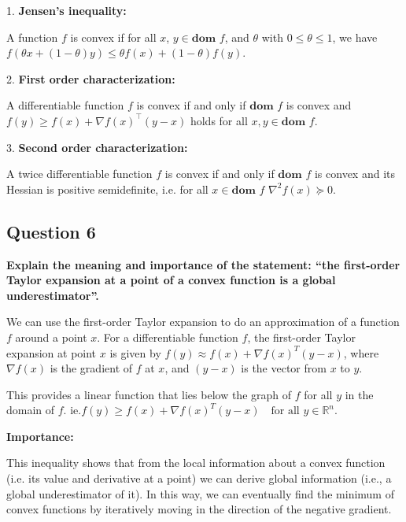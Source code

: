 1. \textbf{Jensen's inequality:} 

A function $f$ is convex if for all $x$, $y \in \textbf{dom } f$, and $\theta$ with $0 \le \theta \le  1$, we have $ f(\theta x + (1 - \theta)y) \le  \theta f(x) + (1 - \theta)f(y)$. 

2. \textbf{First order characterization:} 

A differentiable function $f$ is convex if and only if $\textbf{dom } f$ is convex and $f(y) \ge f(x) + \nabla f(x)^\top (y-x)$ holds for all $x,y \in \textbf{dom }f$. 

3. \textbf{Second order characterization:} 

A twice differentiable function $f$ is convex if and only if $\textbf{dom }f$ is convex and its Hessian is positive semidefinite, i.e. for all $x \in \textbf{dom }f$ $\nabla^2 f(x) \succcurlyeq 0$. 

\subsection*{Question 6}
\textbf{Explain the meaning and importance of the statement: “the ﬁrst-order Taylor expansion at a point of a convex function is a global underestimator”.}

We can use the first-order Taylor expansion to do an approximation of a function \( f \) around a point \( x \). For a differentiable function \( f \), the first-order Taylor expansion at point \( x \) is given by $f(y) \approx f(x) + \nabla f(x)^T (y - x) $, where \( \nabla f(x) \) is the gradient of \( f \) at \( x \), and \( (y - x) \) is the vector from \( x \) to \( y \).

This provides a linear function that lies below the graph of \( f \) for all \( y \) in the domain of \( f \). ie.$ f(y) \geq f(x) + \nabla f(x)^T (y - x) \quad \text{for all } y \in \mathbb{R}^n $. 

\textbf{Importance:} 

This inequality shows that from the local information about a convex function (i.e. its value and derivative at a point) we can derive global information (i.e., a global underestimator of it). In this way, we can eventually find the minimum of convex functions by iteratively moving in the direction of the negative gradient. 